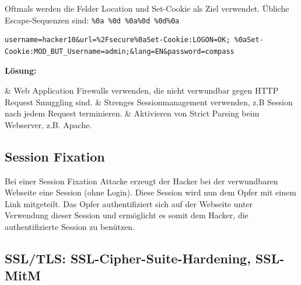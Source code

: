 Oftmals werden die Felder Location und Set-Cookie als Ziel verwendet. Übliche Escape-Sequenzen sind: \lstinline|%0a %0d %0a%0d %0d%0a|

\begin{lstlisting}[language={},caption=Beispiel eines Präparierten Request zur Umgehung einer Pre-Authentication]
username=hacker10&url=%2Fsecure%0aSet-Cookie:LOGON=OK; %0aSet-Cookie:MOD_BUT_Username=admin;&lang=EN&password=compass
\end{lstlisting}

\textbf{Lösung:}
\begin{easylist}
	& Web Application Firewalls verwenden, die nicht verwundbar gegen HTTP Request Smuggling sind.
	& Strenges Sessionmanagement verwenden, z.B Session nach jedem Request terminieren.
	& Aktivieren von Strict Parsing beim Webserver, z.B. Apache.
\end{easylist} 

\subsection{Session Fixation}
Bei einer Session Fixation Attacke erzeugt der Hacker bei der verwundbaren Webseite eine Session (ohne Login). Diese Session wird nun dem Opfer mit einem Link mitgeteilt. Das Opfer authentifiziert sich auf der Webseite unter Verwendung dieser Session und ermöglicht es somit dem Hacker, die authentifizierte Session zu benützen.

\subsection{SSL/TLS: SSL-Cipher-Suite-Hardening, SSL-MitM}

